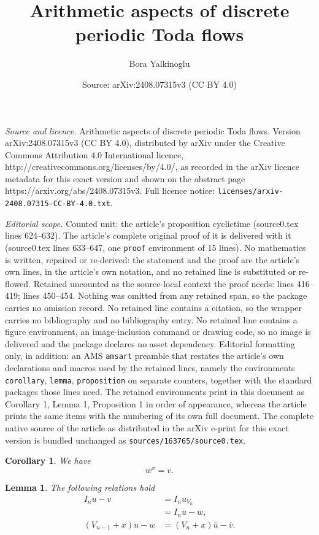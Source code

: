\documentclass[10pt,a4paper]{amsart}
\title{Arithmetic aspects of discrete periodic Toda flows}
\author{Bora Yalkinoglu}
\date{Source: arXiv:2408.07315v3 (CC BY 4.0)}
\newtheorem{corollary}{Corollary}
\newtheorem{lemma}{Lemma}
\newcommand{\eqst}[1]{\begin{equation*}#1\end{equation*}}
\begin{document}
\maketitle

\noindent\emph{Source and licence.} Arithmetic aspects of discrete periodic Toda flows. Version arXiv:2408.07315v3 (CC BY 4.0), distributed by arXiv under the Creative Commons Attribution 4.0 International licence, http://creativecommons.org/licenses/by/4.0/, as recorded in the arXiv licence metadata for this exact version and shown on the abstract page https://arxiv.org/abs/2408.07315v3. Full licence notice: \texttt{licenses/arxiv-2408.07315-CC-BY-4.0.txt}.\par\smallskip

\noindent\textit{Editorial scope.} Counted unit: the article's proposition cyclictime (source0.tex lines 624--632). The article's complete original proof of it is delivered with it (source0.tex lines 633--647, one \texttt{proof} environment of 15 lines). No mathematics is written, repaired or re-derived: the statement and the proof are the article's own lines, in the article's own notation, and no retained line is substituted or re-flowed.  Retained uncounted as the source-local context the proof needs: lines 416--419; lines 450--454.  Nothing was omitted from any retained span, so the package carries no omission record.  No retained line contains a citation, so the wrapper carries no bibliography and no bibliography entry.  No retained line contains a figure environment, an image-inclusion command or drawing code, so no image is delivered and the package declares no asset dependency.  Editorial formatting only, in addition: an AMS \texttt{amsart} preamble that restates the article's own declarations and macros used by the retained lines, namely the environments \texttt{corollary}, \texttt{lemma}, \texttt{proposition} on separate counters, together with the standard packages those lines need.  The retained environments print in this document as Corollary 1, Lemma 1, Proposition 1 in order of appearance, whereas the article prints the same items with the numbering of its own full document.  The complete native source of the article as distributed in the arXiv e-print for this exact version is bundled unchanged as \texttt{sources/163765/source0.tex}.
\begin{corollary}
\label{easycor}
We have \eqst{w^\sigma = v.}
\end{corollary}

\begin{lemma}
\label{keyrelation}
The following relations hold
\begin{align*}I_n u - v &= I_n u_{V_{n}} \\ &= I_n \overline u - \overline w, \\ (V_{n-1}+x)u-w &= (V_n + x)\overline u - \overline v.\end{align*}
\end{lemma}
\end{document}
